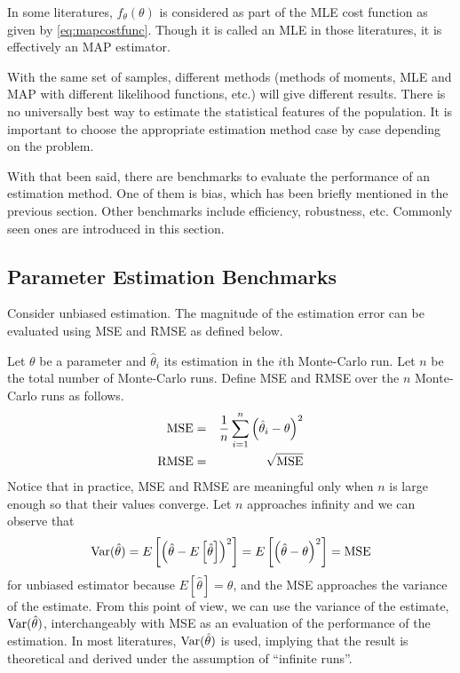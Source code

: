 In some literatures, $f_{\theta}(\theta)$ is considered as part of the MLE cost function as given by \eqref{eq:mapcostfunc}. Though it is called an MLE in those literatures, it is effectively an MAP estimator.

With the same set of samples, different methods (methods of moments, MLE and MAP with different likelihood functions, etc.) will give different results. There is no universally best way to estimate the statistical features of the population. It is important to choose the appropriate estimation method case by case depending on the problem.

With that been said, there are benchmarks to evaluate the performance of an estimation method. One of them is bias, which has been briefly mentioned in the previous section. Other benchmarks include efficiency, robustness, etc. Commonly seen ones are introduced in this section.

\subsection{Parameter Estimation Benchmarks}

Consider unbiased estimation. The magnitude of the estimation error can be evaluated using MSE and RMSE as defined below. 

Let $\theta$ be a parameter and $\hat{\theta}_i$ its estimation in the $i$th Monte-Carlo run. Let $n$ be the total number of Monte-Carlo runs. Define MSE and RMSE over the $n$ Monte-Carlo runs as follows.
\begin{eqnarray}
	\textup{MSE} &=& \dfrac{1}{n}\sum_{i=1}^{n}\left(\hat{\theta}_i-\theta\right)^2 \nonumber \\
	\textup{RMSE} &=& \sqrt{\textup{MSE}} \nonumber
\end{eqnarray}
Notice that in practice, MSE and RMSE are meaningful only when $n$ is large enough so that their values converge. Let $n$ approaches infinity and we can observe that
\begin{eqnarray}
	\textup{Var}(\hat{\theta}) = E\left[\left(\hat{\theta}-E\left[\hat{\theta}\right]\right)^2\right] = E\left[\left(\hat{\theta}-\theta\right)^2\right] = \textup{MSE} \nonumber
\end{eqnarray}
for unbiased estimator because $E\left[\hat{\theta}\right]=\theta$, and the MSE approaches the variance of the estimate. From this point of view, we can use the variance of the estimate, $\textup{Var}(\hat{\theta})$, interchangeably with MSE as an evaluation of the performance of the estimation. In most literatures, $\textup{Var}(\hat{\theta})$ is used, implying that the result is theoretical and derived under the assumption of ``infinite runs''.

